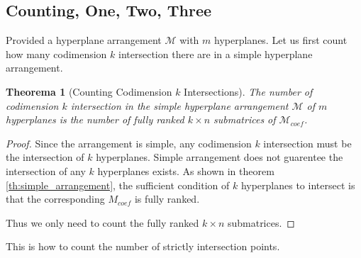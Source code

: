 \documentclass[12pt, a4paper]{article}
\newtheorem{theorem}{Theorema}[subsection]
\theoremstyle{definition}
\theoremstyle{remark}
\begin{document}
\subsection{Counting, One, Two, Three}

Provided a hyperplane arrangement $\mathcal{M}$ with $m$ hyperplanes. 
Let us first count how many codimension $k$ intersection there are in a simple hyperplane arrangement.

\begin{theorem}[Counting Codimension $k$ Intersections]
	The number of codimension $k$ intersection in the simple hyperplane arrangement $\mathcal{M}$ of $m$ hyperplanes is the number of fully ranked $k \times n$ submatrices of $\mathcal{M}_{coef}$.
\end{theorem}

\begin{proof}
	Since the arrangement is simple, any codimension $k$ intersection must be the intersection of $k$ hyperplanes. 
	Simple arrangement does not guarentee the intersection of any $k$ hyperplanes exists. As shown in theorem \ref{th:simple_arrangement}, the sufficient condition of $k$ hyperplanes to intersect is that the corresponding $M_{coef}$ is fully ranked. 
	
	Thus we only need to count the fully ranked $k \times n$ submatrices.
\end{proof}

This is how to count the number of strictly intersection points.
\end{document}
